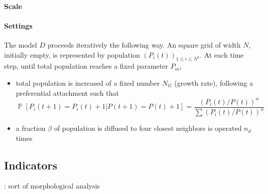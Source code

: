 \documentclass[10pt,letterpaper]{article}
\DeclareMathOperator{\Proba}{\mathbb{P}}
\newcommand{\Pb}[1]{\ensuremath{\Proba\!\left[#1\right]}}
\begin{document}
\paragraph{Scale}



\paragraph{Settings}


The model $D$ proceeds iteratively the following way. An square grid of width $N$, initially empty, is represented by population $(P_i(t))_{1\leq i\leq N^2}$. At each time step, until total population reaches a fixed parameter $P_m$,
\begin{itemize}
\item total population is increased of a fixed number $N_G$ (growth rate), following a preferential attachment such that 
\[\Pb{P_i(t+1)=P_i(t)+1|P(t+1)=P(t)+1}=\frac{(P_i(t)/P(t))^{\alpha}}{\sum(P_i(t)/P(t))^{\alpha}}\]
\item a fraction $\beta$ of population is diffused to four closest neighbors is operated $n_d$ times
\end{itemize}









\subsection{Indicators}



\cite{guerois2008built} : sort of morphological analysis



\end{document}
